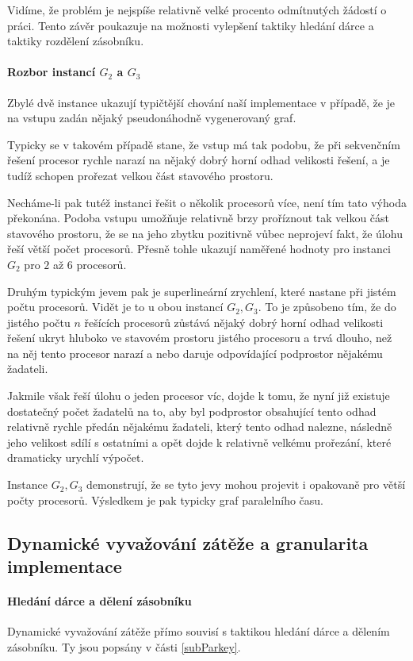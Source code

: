 \documentclass[12pt]{article}
\theoremstyle{definition}
\begin{document}
Vidíme, že problém je nejspíše relativně velké procento odmítnutých žádostí o práci. Tento závěr poukazuje na
možnosti vylepšení taktiky hledání dárce a taktiky rozdělení zásobníku.
\paragraph{Rozbor instancí $G_2$ a $G_3$}\mbox{}\newline
Zbylé dvě instance ukazují typičtější chování naší implementace v případě, že je na vstupu
zadán nějaký pseudonáhodně vygenerovaný graf.

Typicky se v takovém případě stane, že vstup má tak  podobu, že při sekvenčním řešení procesor
rychle narazí na nějaký dobrý horní odhad velikosti řešení, a je tudíž schopen prořezat velkou část stavového prostoru.

Necháme-li pak tutéž instanci řešit o několik procesorů více, není tím tato výhoda překonána. Podoba vstupu umožňuje
relativně brzy proříznout tak velkou část stavového prostoru, že se na jeho zbytku pozitivně vůbec neprojeví fakt, že úlohu řeší
větší počet procesorů. Přesně tohle ukazují naměřené hodnoty pro instanci $G_2$ pro $2$ až $6$ procesorů.

Druhým typickým jevem pak je superlineární zrychlení, které  nastane při jistém počtu procesorů. Vidět je to
u obou instancí $G_2, G_3$. To je způsobeno tím, že do jistého počtu $n$ řešících procesorů zůstává nějaký
dobrý horní odhad velikosti řešení ukryt hluboko ve stavovém prostoru jistého procesoru a trvá dlouho, než na něj tento procesor narazí a nebo
daruje odpovídající podprostor nějakému žadateli.

Jakmile však řeší úlohu o jeden procesor víc, dojde k tomu, že nyní již existuje dostatečný počet žadatelů na to, aby
byl podprostor obsahující tento odhad relativně rychle předán nějakému žadateli, který tento odhad nalezne, následně jeho velikost
sdílí s ostatními a opět dojde k relativně velkému prořezání, které dramaticky urychlí výpočet.

Instance $G_2, G_3$ demonstrují, že se tyto jevy mohou projevit i opakovaně pro větší počty procesorů. Výsledkem je pak
typicky  graf paralelního času.
\subsection{Dynamické vyvažování zátěže a granularita implementace}
\paragraph{Hledání dárce a dělení zásobníku}\mbox{}\newline
Dynamické vyvažování zátěže přímo souvisí s taktikou hledání dárce a dělením zásobníku. Ty jsou
popsány v části \ref{subParkey}.
\end{document}
